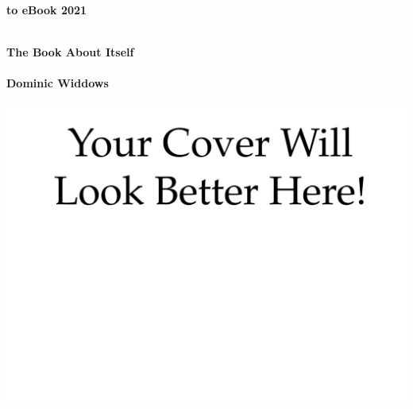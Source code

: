 
\thispagestyle{empty}

\vspace{3cm}
  \begin{center}
	\bfseries \Huge \latex to eBook 2021 \par   %
        ~\\
	\bfseries \LARGE The Book About Itself \\   %
        ~\\
        \bfseries \Large Dominic Widdows \par   %

        \vspace{3cm}
    
      	{\centering \includegraphics[width=0.8\linewidth]{images/cover.png}}
    \end{center}
    
\par

\newpage
